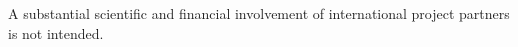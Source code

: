 
A substantial scientific and financial involvement of international project partners is not intended.